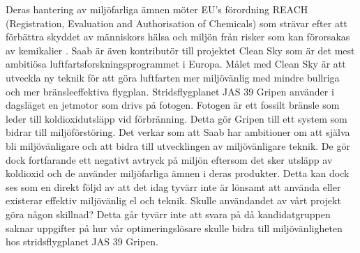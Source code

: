 \newline
\newline 
Deras hantering av miljöfarliga ämnen möter EU's förordning REACH (Registration, Evaluation and Authorisation of Chemicals) som strävar efter att förbättra skyddet av människors hälsa och miljön från risker som kan förorsakas av kemikalier \citep{reach}. 
Saab är även kontributör till projektet Clean Sky som är det mest ambitiösa luftfartsforskningsprogrammet i Europa. Målet med Clean Sky är att utveckla ny teknik för att göra luftfarten mer miljövänlig med mindre bullriga och mer bränsleeffektiva flygplan. \citep{cleansky}     
\newline
\newline
Stridsflygplanet JAS 39 Gripen använder i dagsläget en jetmotor som drivs på fotogen. Fotogen är ett fossilt bränsle som leder till koldioxidutsläpp vid förbränning. Detta gör Gripen till ett system som bidrar till miljöförstöring. 
\newline
\newline
Det verkar som att Saab har ambitioner om att själva bli miljövänligare och att bidra till utvecklingen av miljövänligare teknik. De gör dock fortfarande ett negativt avtryck på miljön eftersom det sker utsläpp av koldioxid och de använder miljöfarliga ämnen i deras produkter. Detta kan dock ses som en direkt följd av att det idag tyvärr inte är lönsamt att använda eller existerar effektiv miljövänlig el och teknik.  
\newline
\newline
Skulle användandet av vårt projekt göra någon skillnad? Detta går tyvärr inte att svara på då kandidatgruppen saknar uppgifter på hur vår optimeringslösare skulle bidra till miljövänligheten hos stridsflygplanet JAS 39 Gripen.        